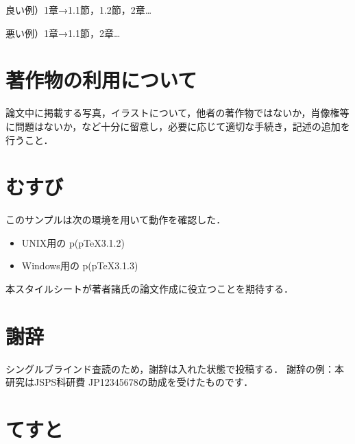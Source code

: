 \documentclass[twoside]{wiss}
\begin{document}
良い例）1章→1.1節，1.2節，2章…

悪い例）1章→1.1節，2章…

\section{著作物の利用について}
論文中に掲載する写真，イラストについて，他者の著作物ではないか，肖像権等に問題はないか，など十分に留意し，必要に応じて適切な手続き，記述の追加を行うこと．


\section{むすび}

このサンプルは次の環境を用いて動作を確認した．
\begin{itemize}
\item UNIX用の p\LaTeXe (p\TeX3.1.2)
\item Windows用の p\LaTeXe (p\TeX3.1.3)
\end{itemize}
本スタイルシートが著者諸氏の論文作成に役立つことを期待する．

\section*{謝辞}
シングルブラインド査読のため，謝辞は入れた状態で投稿する．
謝辞の例：本研究はJSPS科研費 JP12345678の助成を受けたものです．







\section{てすと}
\end{document}

